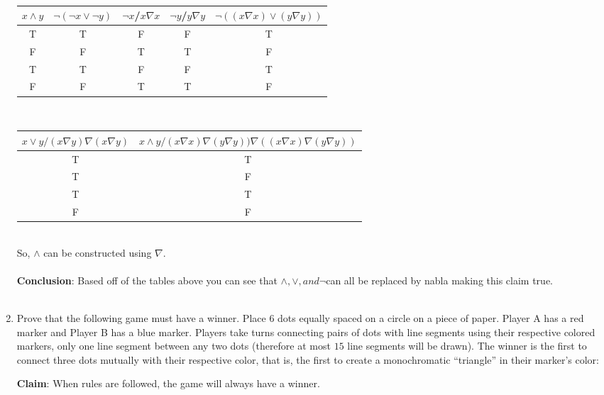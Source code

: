 \documentclass[10pt, AMS Euler]{article}
\begin{document}
\begin{enumerate}
\\\begin{tabular}{|c||c|c|c|c|}
              \hline
               $x \wedge y$& $ \neg(\neg x \vee \neg y)$&$\neg x$/$x \nabla x$&$\neg y$/$y \nabla y$&$\neg((x \nabla x) \vee (y \nabla y))$ \\
              \hline
               T& T&F&F  & T\\
              \hline
               F& F&T&T & F\\
              \hline
  T& T&F&F  & T\\\hline
  F& F&T&T  & F\\\hline
            \end{tabular}
\\\begin{tabular}{|c||c|}
              \hline
               $ x \vee y / (x \nabla y) \nabla (x \nabla y)$& $x \wedge y/(x \nabla x)\nabla (y \nabla y)) \nabla ((x \nabla x) \nabla (y \nabla y))$\\
              \hline
               T& T\\
              \hline
               T & F\\
              \hline
  T& T\\\hline
  F& F\\\hline
            \end{tabular}
\\ So, $\wedge$ can be constructed using $\nabla$. 
\\ \\ \textbf{Conclusion}: Based off of the tables above you can see that $\wedge, \vee, and \neg$can all be replaced by nabla making this claim true. \\\\
\item Prove that the following game must have a winner.  Place $6$ dots equally spaced on a circle on a piece of paper.
		Player A has a red marker and Player B has a blue marker.
		Players take turns connecting pairs of dots with line segments using their respective colored markers,
		only one line segment between any two dots (therefore at most $15$ line segments will be drawn).
		The winner is the first to connect three dots mutually with their respective color, that is, the first to create a monochromatic ``triangle''
		in their marker's color:
        
\textbf{Claim}: When rules are followed, the game will always have a winner.


\end{enumerate}
\end{document}
